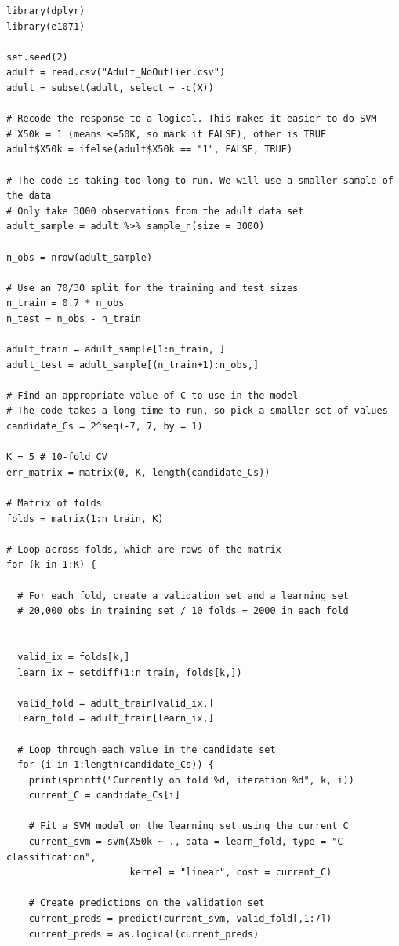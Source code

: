\documentclass{article}
\begin{document}
\begin{verbatim}
library(dplyr)
library(e1071)

set.seed(2)
adult = read.csv("Adult_NoOutlier.csv")
adult = subset(adult, select = -c(X))

# Recode the response to a logical. This makes it easier to do SVM
# X50k = 1 (means <=50K, so mark it FALSE), other is TRUE
adult$X50k = ifelse(adult$X50k == "1", FALSE, TRUE)

# The code is taking too long to run. We will use a smaller sample of the data
# Only take 3000 observations from the adult data set 
adult_sample = adult %>% sample_n(size = 3000)

n_obs = nrow(adult_sample)

# Use an 70/30 split for the training and test sizes
n_train = 0.7 * n_obs
n_test = n_obs - n_train

adult_train = adult_sample[1:n_train, ]
adult_test = adult_sample[(n_train+1):n_obs,]

# Find an appropriate value of C to use in the model 
# The code takes a long time to run, so pick a smaller set of values
candidate_Cs = 2^seq(-7, 7, by = 1)

K = 5 # 10-fold CV
err_matrix = matrix(0, K, length(candidate_Cs))

# Matrix of folds 
folds = matrix(1:n_train, K)

# Loop across folds, which are rows of the matrix 
for (k in 1:K) {
  
  # For each fold, create a validation set and a learning set 
  # 20,000 obs in training set / 10 folds = 2000 in each fold 
  
  
  valid_ix = folds[k,]
  learn_ix = setdiff(1:n_train, folds[k,])
  
  valid_fold = adult_train[valid_ix,]
  learn_fold = adult_train[learn_ix,]
  
  # Loop through each value in the candidate set 
  for (i in 1:length(candidate_Cs)) {
    print(sprintf("Currently on fold %d, iteration %d", k, i))
    current_C = candidate_Cs[i]
    
    # Fit a SVM model on the learning set using the current C
    current_svm = svm(X50k ~ ., data = learn_fold, type = "C-classification",
                      kernel = "linear", cost = current_C)
    
    # Create predictions on the validation set
    current_preds = predict(current_svm, valid_fold[,1:7])
    current_preds = as.logical(current_preds)
    

\end{verbatim}
\end{document}
